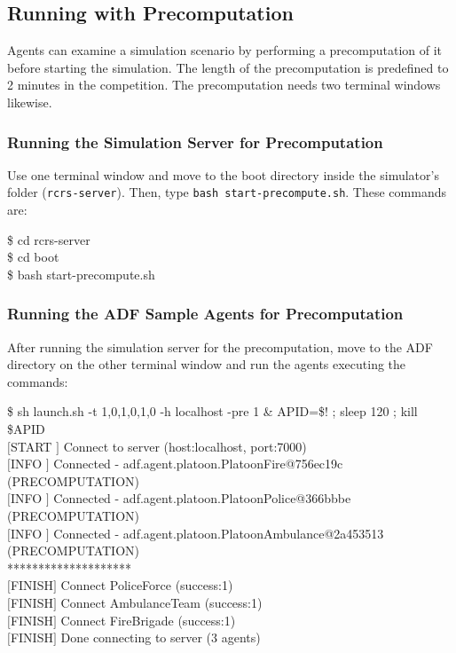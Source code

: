 \documentclass{article}
\begin{document}
\subsection{Running with Precomputation}
Agents can examine a simulation scenario by performing a precomputation of it before starting the simulation. The length of the precomputation is predefined to 2 minutes in the competition. The precomputation needs two terminal windows likewise.
\subsubsection{Running the Simulation Server for Precomputation}
Use one terminal window and move to the boot directory inside the simulator's folder (\texttt{rcrs-server}). Then, type \texttt{bash start-precompute.sh}. These commands are:
\begin{center}
   \begin{tcolorbox}[title=Running Simulation Server, width=.98\linewidth]
    {\ttfamily
    \$ cd rcrs-server\\
    \$ cd boot\\
    \$ bash start-precompute.sh
    }
  \end{tcolorbox}
\end{center}
\subsubsection{Running the ADF Sample Agents for Precomputation}
After running the simulation server for the precomputation, move to the ADF directory on the other terminal window and run the agents executing the commands:
\begin{center}
   \begin{tcolorbox}[title=Running Sample Agents, width=.98\linewidth]
    {\ttfamily
    \$ sh launch.sh -t 1,0,1,0,1,0 -h localhost -pre 1 \& APID=\$! ; sleep 120 ;
    kill \$APID\\
    $[$START $]$ Connect to server (host:localhost, port:7000)\\
    $[$INFO  $]$ Connected - adf.agent.platoon.PlatoonFire@756ec19c (PRECOMPUTATION)\\
    $[$INFO  $]$ Connected - adf.agent.platoon.PlatoonPolice@366bbbe (PRECOMPUTATION)\\
    $[$INFO  $]$ Connected - adf.agent.platoon.PlatoonAmbulance@2a453513 (PRECOMPUTATION)\\
    ********************\\
    $[$FINISH$]$ Connect PoliceForce (success:1)\\
    $[$FINISH$]$ Connect AmbulanceTeam (success:1)\\
    $[$FINISH$]$ Connect FireBrigade (success:1)\\
    $[$FINISH$]$ Done connecting to server (3 agents)
    }
  \end{tcolorbox}
\end{center}
\end{document}
